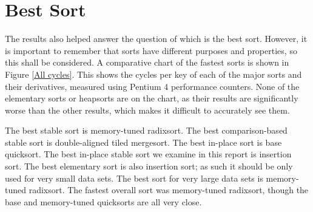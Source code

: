 \section{Best Sort}

The results also helped answer the question of which is the best sort. However,
it is important to remember that sorts have different purposes and properties,
so this shall be considered. A comparative chart of the fastest sorts is shown
in Figure \vref{All cycles}. This shows the cycles per key of each of the major
sorts and their derivatives, measured using Pentium 4 performance counters.
None of the elementary sorts or heapsorts are on the chart, as their results
are significantly worse than the other results, which makes it difficult to
accurately see them.


The best stable sort is memory-tuned radixsort. The best comparison-based stable
sort is double-aligned tiled mergesort. The best in-place sort is base
quicksort. The best in-place stable sort we examine in this report is insertion
sort. The best elementary sort is also insertion sort; as such it should be only
used for very small data sets. The best sort for very large data sets is
memory-tuned radixsort. The fastest overall sort was memory-tuned radixsort,
though the base and memory-tuned quicksorts are all very close.


